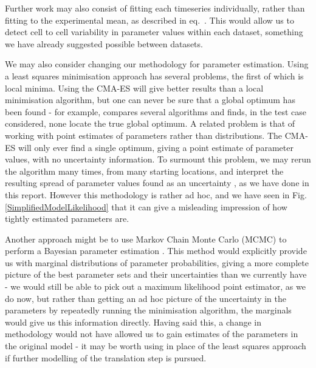 \documentclass[10pt,journal]{./IEEE_latex_class/IEEEtran}
\renewcommand{\eqref}{eq.~\originaleqref}
\begin{document}
Further work may also consist of fitting each timeseries individually, rather than fitting to the experimental mean, as described in \eqref{eq:min}. This would allow us to detect cell to cell variability in parameter values within each dataset, something we have already suggested possible between datasets.

We may also consider changing our methodology for parameter estimation. Using a least squares minimisation approach has several problems, the first of which is local minima. Using the CMA-ES will give better results than a local minimisation algorithm, but one can never be sure that a global optimum has been found - for example, \cite{Algorithms2003} compares several algorithms and finds, in the test case considered, none locate the true global optimum.
A related problem is that of working with point estimates of parameters rather than distributions. The CMA-ES will only ever find a single optimum, giving a point estimate of parameter values, with no uncertainty information. To surmount this problem, we may rerun the algorithm many times, from many starting locations, and interpret the resulting spread of parameter values found as an uncertainty \cite{Hu2015}, as we have done in this report. However this methodology is rather ad hoc, and we have seen in Fig. \ref{SimplifiedModelLikelihood} that it can give a misleading impression of how tightly estimated parameters are.

Another approach might be to use Markov Chain Monte Carlo (MCMC) to perform a Bayesian parameter estimation \cite{Jitjareonchai2006,Andrieu2003}. This method would explicitly provide us with marginal distributions of parameter probabilities, giving a more complete picture of the best parameter sets and their uncertainties than we currently have - we would still be able to pick out a maximum likelihood point estimator, as we do now, but rather than getting an ad hoc picture of the uncertainty in the parameters by repeatedly running the minimisation algorithm, the marginals would give us this information directly. Having said this, a change in methodology would not have allowed us to gain estimates of the parameters in the original model - it may be worth using in place of the least squares approach if further modelling of the translation step is pursued.
\end{document}
